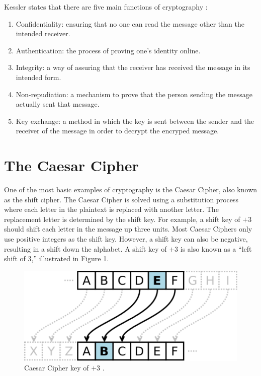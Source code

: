 \documentclass{article}
\begin{document}
Kessler states that there are five main functions of cryptography \cite{ref2:2}:
\begin{enumerate}
    \item Confidentiality: ensuring that no one can read the message other than the intended receiver.
    \item Authentication: the process of proving one’s identity online.
    \item Integrity: a way of assuring that the receiver has received the message in its intended form.
    \item Non-repudiation: a mechanism to prove that the person sending the message actually sent that message.
    \item Key exchange: a method in which the key is sent between the sender and the receiver of the message in order to decrypt the encryped message.
\end{enumerate}

\section{The Caesar Cipher}
One of the most basic examples of cryptography is the Caesar Cipher, also known as the shift cipher. The Caesar Cipher is solved using a substitution process where each letter in the plaintext is replaced with another letter. The replacement letter is determined by the shift key. For example, a shift key of $+3$ should shift each letter in the message up three units. Most Caesar Ciphers only use positive integers as the shift key. However, a shift key can also be negative, resulting in a shift down the alphabet. A shift key of $+3$ is also known as a ``left shift of 3,” illustrated in Figure 1.\\

\begin{figure}[h]
    \centering
    \includegraphics[scale=0.4]{caesar_cipher}
    \caption{Caesar Cipher key of $+3$ \cite{ref3:3}.}
    \label{fig:enter-label}
\end{figure}
\end{document}
